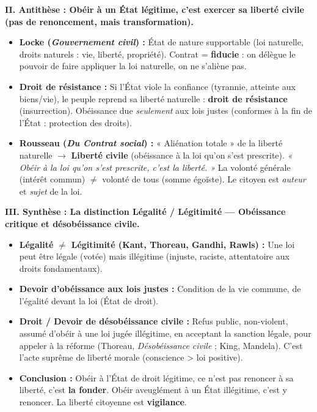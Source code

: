 \documentclass[11pt]{article}
\newcommand{\cle}[1]{{\popxbold\color{popdark}#1}}
\begin{document}
\begin{corrige}
\textbf{II. Antithèse : Obéir à un État légitime, c'est exercer sa liberté civile (pas de renoncement, mais transformation).}
\begin{itemize}
\item \textbf{Locke (\emph{Gouvernement civil}) :} État de nature supportable (loi naturelle, droits naturels : vie, liberté, propriété). Contrat = \textbf{fiducie} : on délègue le pouvoir de faire appliquer la loi naturelle, on ne s'aliène pas.
\item \textbf{Droit de résistance :} Si l'État viole la confiance (tyrannie, atteinte aux biens/vie), le peuple reprend sa liberté naturelle : \textbf{droit de résistance} (insurrection). Obéissance due \emph{seulement} aux lois justes (conformes à la fin de l'État : protection des droits).
\item \textbf{Rousseau (\emph{Du Contrat social}) :} « Aliénation totale » de la liberté naturelle $\rightarrow$ \textbf{Liberté civile} (obéissance à la loi qu'on s'est prescrite). \emph{« Obéir à la loi qu'on s'est prescrite, c'est la liberté. »} La \cle{volonté générale} (intérêt commun) $\neq$ volonté de tous (somme égoïste). Le citoyen est \emph{auteur} et \emph{sujet} de la loi.
\end{itemize}

\textbf{III. Synthèse : La distinction Légalité / Légitimité — Obéissance critique et désobéissance civile.}
\begin{itemize}
\item \textbf{Légalité $\neq$ Légitimité (Kant, Thoreau, Gandhi, Rawls) :} Une loi peut être légale (votée) mais illégitime (injuste, raciste, attentatoire aux droits fondamentaux).
\item \textbf{Devoir d'obéissance aux lois justes :} Condition de la vie commune, de l'égalité devant la loi (État de droit).
\item \textbf{Droit / Devoir de désobéissance civile :} Refus public, non-violent, assumé d'obéir à une loi jugée illégitime, en acceptant la sanction légale, pour appeler à la réforme (Thoreau, \emph{Désobéissance civile} ; King, Mandela). C'est l'acte suprême de liberté morale (conscience > loi positive).
\item \textbf{Conclusion :} Obéir à l'État de droit légitime, ce n'est pas renoncer à sa liberté, c'est \textbf{la fonder}. Obéir aveuglément à un État illégitime, c'est y renoncer. La liberté citoyenne est \textbf{vigilance}.
\end{itemize}


\end{corrige}
\end{document}
